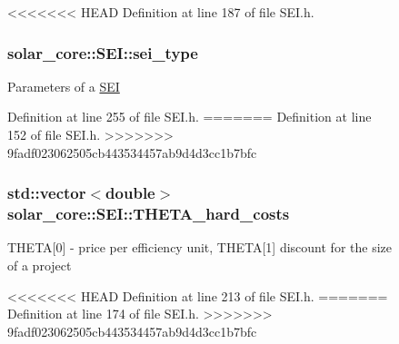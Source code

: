 \begin{figure}[H]
\begin{center}
<<<<<<< HEAD
Definition at line 187 of file S\+E\+I.\+h.

\hypertarget{classsolar__core_1_1_s_e_i_a788ef7ae27cee8b9b99b57eba9ab2981}{}
\subsubsection[{sei\+\_\+type}]{ solar\+\_\+core\+::\+S\+E\+I\+::sei\+\_\+type\hspace{0.3cm}{\ttfamily [protected]}}\label{classsolar__core_1_1_s_e_i_a788ef7ae27cee8b9b99b57eba9ab2981}
Parameters of a \hyperlink{classsolar__core_1_1_s_e_i}{S\+E\+I} 

Definition at line 255 of file S\+E\+I.\+h.
=======
Definition at line 152 of file S\+E\+I.\+h.
>>>>>>> 9fadf023062505cb443534457ab9d4d3cc1b7bfc

\hypertarget{classsolar__core_1_1_s_e_i_a4723f6d0e5098b9b2f553c9ef6c5545f}{}
\subsubsection[{T\+H\+E\+T\+A\+\_\+hard\+\_\+costs}]{\setlength{\rightskip}{0pt plus 5cm}std\+::vector$<$double$>$ solar\+\_\+core\+::\+S\+E\+I\+::\+T\+H\+E\+T\+A\+\_\+hard\+\_\+costs\hspace{0.3cm}{\ttfamily [protected]}}\label{classsolar__core_1_1_s_e_i_a4723f6d0e5098b9b2f553c9ef6c5545f}
T\+H\+E\+T\+A\mbox{[}0\mbox{]} -\/ price per efficiency unit, T\+H\+E\+T\+A\mbox{[}1\mbox{]} discount for the size of a project 

<<<<<<< HEAD
Definition at line 213 of file S\+E\+I.\+h.
=======
Definition at line 174 of file S\+E\+I.\+h.
>>>>>>> 9fadf023062505cb443534457ab9d4d3cc1b7bfc

\hypertarget{classsolar__core_1_1_s_e_i_a9137f81a58ab1325d8b37590afe267aa}{}

\end{center}
\end{figure}
